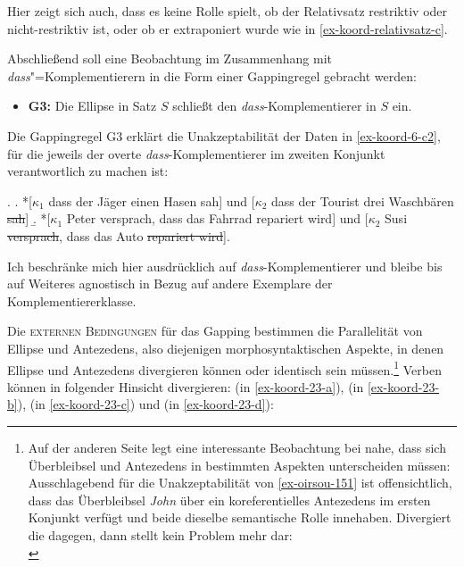 Hier zeigt sich auch, dass es keine Rolle spielt, ob der Relativsatz restriktiv oder nicht-restriktiv ist, oder ob er extraponiert wurde wie in \ref{ex-koord-relativsatz-c}. 

Abschlie\ss end soll eine Beobachtung im Zusammenhang mit \emph{dass}"=Komplementierern in die Form einer Gappingregel gebracht werden:    
\begin{itemize}  
  \item[] {\bf G3:} Die Ellipse in Satz $S$ schlie\ss t den \emph{dass}-Komplementierer in $S$ ein.
\end{itemize}
Die Gappingregel G3 erklärt die Unakzeptabilität der Daten in \ref{ex-koord-6-c2}, für die jeweils der overte \emph{dass}-Komplementierer im zweiten Konjunkt verantwortlich zu machen ist:  

\ex. \label{ex-koord-6-c2}
\a. *[$\kappa_1$ dass der Jäger einen Hasen sah] und [$\kappa_2$ dass der Tourist drei Waschbären \sout{sah}]\label{ex-koord-6-c2-a}
\b. *[$\kappa_1$ Peter versprach, dass das Fahrrad repariert wird] und [$\kappa_2$ Susi \sout{versprach}, dass das Auto \sout{repariert wird}].\label{ex-koord-6-c2-b} 

Ich beschränke mich hier ausdrücklich auf \emph{dass}-Komplementierer und bleibe bis auf Weiteres agnostisch in Bezug auf andere Exemplare der Komplementiererklasse. 


Die \textsc{externen Bedingungen} \label{sec-ext-bedingungen} für das Gapping bestimmen die Parallelität von Ellipse und Antezedens, also diejenigen morphosyntaktischen Aspekte, in denen Ellipse und Antezedens divergieren können oder identisch sein müssen.\footnote{Auf der anderen Seite legt eine interessante Beobachtung bei \cite{Oirsouw:87} nahe, dass sich Überbleibsel und Antezedens in bestimmten Aspekten unterscheiden müssen:\\
Ausschlagebend für die Unakzeptabilität von \ref{ex-oirsou-151} ist offensichtlich, dass das Überbleibsel {\it John} über ein koreferentielles Antezedens im ersten Konjunkt verfügt und beide dieselbe semantische Rolle innehaben. Divergiert die  dagegen, dann stellt  kein Problem mehr dar:\\  
} Verben können in folgender Hinsicht divergieren:  (in \ref{ex-koord-23-a}),  (in \ref{ex-koord-23-b}),  (in \ref{ex-koord-23-c}) und  (in \ref{ex-koord-23-d}):

